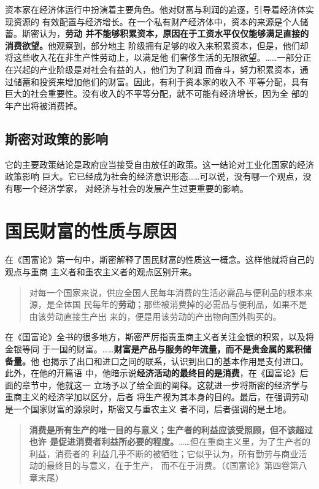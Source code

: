 资本家在经济体运行中扮演着主要角色。他对财富与利润的追逐，引导着经济体实现资源的
有效配置与经济增长。在一个私有财产经济体中，资本的来源是个人储蓄。斯密认为，\textbf{劳动
并不能够积累资本，原因在于工资水平仅仅能够满足直接的消费欲望。}他观察到，部分地主
阶级拥有足够的收入来积累资本，但是，他们却将这些收入花在非生产性劳动上，以满足他
们奢侈生活的无限欲望。……一部分正在兴起的产业阶级是对社会有益的人，他们为了利润
而奋斗，努力积累资本，通过储蓄和投资来增加他们的财富。因此，有利于资本家的收入不
平等分配，具有巨大的社会重要性。没有收入的不平等分配，就不可能有经济增长，因为全
部的年产出将被消费掉。

\subsection{斯密对政策的影响}

它的主要政策结论是政府应当接受自由放任的政策。这一结论对工业化国家的经济政策影响
巨大。它已经成为社会的经济意识形态……可以说，没有哪一个观点，没有哪一个经济学家，
对经济与社会的发展产生过更重要的影响。

\section{国民财富的性质与原因}

在《国富论》第一句中，斯密解释了国民财富的性质这一概念。这样他就将自己的观点与重商
主义者和重农主义者的观点区别开来。

\begin{quotation}
  对每一个国家来说，供应全国人民每年消费的生活必需品与便利品的根本来源，是全体国
  民每年的\textbf{劳动}；那些被消费掉的必需品与便利品，如果不是由该劳动直接生产出
  来的，便是用该劳动的产出物向国外购买的。
\end{quotation}

在《国富论》全书的很多地方，斯密严厉指责重商主义者关注金银的积累，以及将金银等同
于一国的财富。……\textbf{财富是产品与服务的年流量，而不是贵金属的累积储备量。}他
也揭示了出口和进口之间的联系，认识到出口的基本作用是支付进口。此外，在他的开篇语
中，他暗示说\textbf{经济活动的最终目的是消费}，在《国富论》后面的章节中，他就这一
立场予以了给全面的阐释。这就进一步将斯密的经济学与重商主义的经济学加以区分，后者
将生产视为其本身的目的。最后，在强调劳动是一个国家财富的源泉时，斯密又与重农主义
者不同，后者强调的是土地。

\begin{quotation}
  \textbf{消费是所有生产的唯一目的与意义；生产者的利益应该受照顾，但不该超过也许
    是促进消费者利益所必要的程度。}……但在重商主义里，为了生产者的利益，消费者的
  利益几乎不断的被牺牲；它似乎认为，所有勤劳与商业活动的最终目的与意义，在于生产，
  而不在于消费。（《国富论》第四卷第八章末尾）
\end{quotation}

